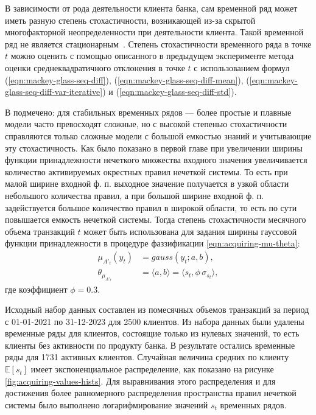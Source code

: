 В зависимости от рода деятельности клиента банка, сам временной ряд может иметь разную степень стохастичности, возникающей из-за скрытой многофакторной неопределенности при деятельности клиента. Такой временной ряд не является стационарным~\cite{OrlovEconometricsTS, NaumovTSForecasting}. Степень стохастичности временного ряда в точке $t$ можно оценить с помощью описанного в предыдущем эксперименте метода оценки среднеквадратичного отклонения в точке $t$ с использованием формул (\ref{eqn:mackey-glass-seq-diff}),  (\ref{eqn:mackey-glass-seq-diff-mean}), (\ref{eqn:mackey-glass-seq-diff-var-iterative}) и (\ref{eqn:mackey-glass-seq-diff-std}).

В \cite{Green2015} подмечено: для стабильных временных рядов --- более простые и плавные модели часто превосходят сложные, но с высокой степенью стохастичности справляются только сложные модели с большой емкостью знаний и учитывающие эту стохастичность. Как было показано в первой главе при увеличении ширины функции принадлежности нечеткого множества входного значения увеличивается количество активируемых окрестных правил нечеткой системы. То есть при малой ширине входной ф. п. выходное значение получается в узкой области небольшого количества правил, а при большой ширине входной ф. п. задействуется большое количество правил в широкой области, то есть по сути повышается емкость нечеткой системы. Тогда степень стохастичности месячного объема транзакций $t$ может быть использована для задания ширины гауссовой функции принадлежности в процедуре фаззификации \eqref{eqn:acquiring-mu-theta}:
\begin{equation}
	\label{eqn:acquiring-mu-theta}
	\begin{aligned}
		\mu_{A'_t}(y_t) &= gauss(y_t; a, b), \\
		\theta_{\mu_{A'_t}} &= \langle a, b \rangle = \langle s_t, \phi\,\sigma_{s_t}\rangle,
	\end{aligned}
\end{equation}
где коэффициент $\phi = 0.3$.

Исходный набор данных составлен из помесячных объемов транзакций за период с 01-01-2021 по 31-12-2023 для 2500 клиентов. Из набора данных были удалены временные ряды для клиентов, состоящие только из нулевых значений, то есть клиенты без активности по продукту банка. В результате остались временные ряды для 1731 активных клиентов. Случайная величина средних по клиенту $\mathbb{E}[s_t]$ имеет экспоненциальное распределение, как показано на рисунке \cref{fig:acquiring-values-hists}. Для выравнивания этого распределения и для достижения более равномерного распределения пространства правил нечеткой системы было выполнено логарифмирование значений $s_t$ временных рядов.

